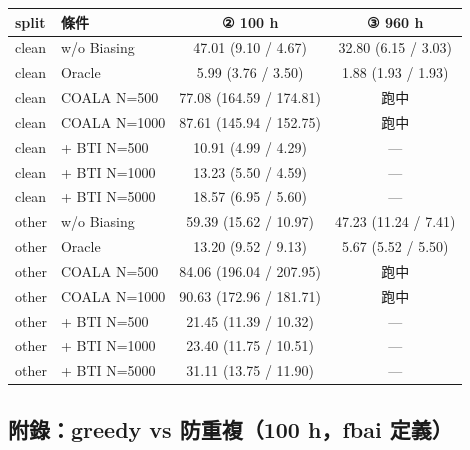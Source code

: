 \documentclass[11pt,a4paper]{article}
\newcommand{\todo}{---}                 %
\newcommand{\running}{跑中}
\begin{document}
\begin{center}
{\small
\begin{tabular}{llcc}
\toprule
\textbf{split} & \textbf{條件} & \textbf{② 100 h} & \textbf{③ 960 h} \\
\midrule
clean & w/o Biasing & 47.01 (9.10 / 4.67) & 32.80 (6.15 / 3.03) \\
clean & Oracle & 5.99 (3.76 / 3.50) & 1.88 (1.93 / 1.93) \\
clean & COALA N=500 & 77.08 (164.59 / 174.81) & \running \\
clean & COALA N=1000 & 87.61 (145.94 / 152.75) & \running \\
clean & + BTI N=500 & 10.91 (4.99 / 4.29) & \todo \\
clean & + BTI N=1000 & 13.23 (5.50 / 4.59) & \todo \\
clean & + BTI N=5000 & 18.57 (6.95 / 5.60) & \todo \\
\midrule
other & w/o Biasing & 59.39 (15.62 / 10.97) & 47.23 (11.24 / 7.41) \\
other & Oracle & 13.20 (9.52 / 9.13) & 5.67 (5.52 / 5.50) \\
other & COALA N=500 & 84.06 (196.04 / 207.95) & \running \\
other & COALA N=1000 & 90.63 (172.96 / 181.71) & \running \\
other & + BTI N=500 & 21.45 (11.39 / 10.32) & \todo \\
other & + BTI N=1000 & 23.40 (11.75 / 10.51) & \todo \\
other & + BTI N=5000 & 31.11 (13.75 / 11.90) & \todo \\
\bottomrule
\end{tabular}
}
\end{center}

\subsection*{附錄：greedy vs 防重複（100 h，fbai 定義）}
\end{document}
